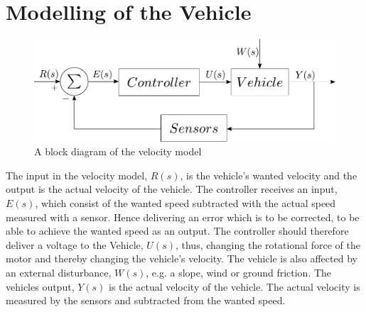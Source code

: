 \chapter{Modelling of the Vehicle}\label{cha:ModelOfVehicle}

\begin{figure}[H]
	\centering
	\includegraphics[scale=0.6]{figures/StartTotalModelsystem.pdf}
	\caption{A block diagram of the velocity model}
	\label{fig:StartTotalModelsystem}
\end{figure}

The input in the velocity model, $R(s)$, is the vehicle's wanted velocity and the output is the actual velocity of the vehicle. The controller receives an input, $E(s)$, which consist of the wanted speed subtracted with the actual speed measured with a sensor. Hence delivering an error which is to be corrected, to be able to achieve the wanted speed as an output. The controller should therefore deliver a voltage to the Vehicle, $U(s)$, thus, changing the rotational force of the motor and thereby changing the vehicle's velocity. The vehicle is also affected by an external disturbance, $W(s)$, e.g. a slope, wind or ground friction. The vehicles output, $Y(s)$ is the actual velocity of the vehicle. The actual velocity is measured by the sensors and subtracted from the wanted speed.